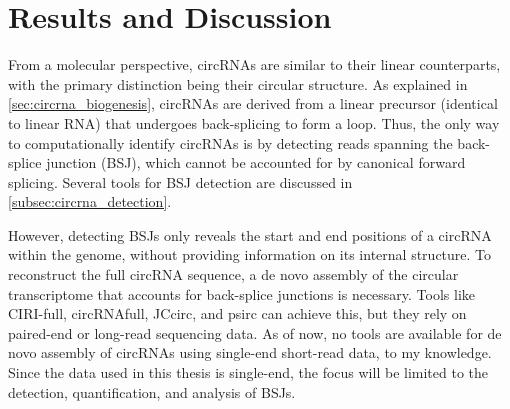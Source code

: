 \chapter{Results and Discussion}

From a molecular perspective, circRNAs are similar to their linear
counterparts, with the primary distinction being their circular structure.
As explained in \cref{sec:circrna_biogenesis}, circRNAs are derived from a
linear precursor (identical to linear RNA) that undergoes back-splicing to form
a loop.
Thus, the only way to computationally identify circRNAs is by detecting reads
spanning the back-splice junction (BSJ), which cannot be accounted for by
canonical forward splicing.
Several tools for BSJ detection are discussed in
\cref{subsec:circrna_detection}.

However, detecting BSJs only reveals the start and end positions of a circRNA
within the genome, without providing information on its internal structure.
To reconstruct the full circRNA sequence, a de novo assembly of the circular
transcriptome that accounts for back-splice junctions is necessary.
Tools like CIRI-full, circRNAfull, JCcirc, and psirc can achieve this, but they
rely on paired-end or long-read sequencing data.
As of now, no tools are available for de novo assembly of circRNAs using
single-end short-read data, to my knowledge.
Since the data used in this thesis is single-end, the focus will be limited to
the detection, quantification, and analysis of BSJs.





